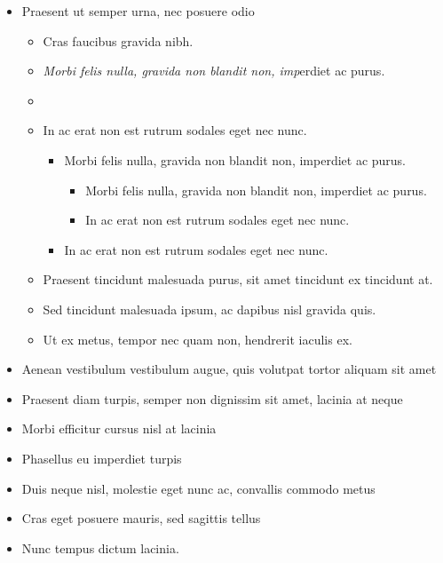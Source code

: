 \documentclass[12pt,a4paper]{report}
\begin{document}
\begin{itemize}
    \item Praesent ut semper urna, nec posuere odio
        \begin{itemize}
            \item  Cras faucibus gravida nibh.
            \item  \emph{Morbi felis nulla, gravida non blandit non, imp}erdiet ac purus.
            \item \hyperref[Mini Section1]{}
            \item  In ac erat non est rutrum sodales eget nec nunc.
                \begin{itemize}
                    \item  Morbi felis nulla, gravida non blandit non, imperdiet ac purus.
                    \begin{itemize}
                        \item  Morbi felis nulla, gravida non blandit non, imperdiet ac purus.
                        \item  In ac erat non est rutrum sodales eget nec nunc.
                    \end{itemize}
                    \item  In ac erat non est rutrum sodales eget nec nunc.
                \end{itemize}
            \item  Praesent tincidunt malesuada purus, sit amet tincidunt ex tincidunt at.
            \item  Sed tincidunt malesuada ipsum, ac dapibus nisl gravida quis.
            \item  Ut ex metus, tempor nec quam non, hendrerit iaculis ex.
        \end{itemize}
    \item Aenean vestibulum vestibulum augue, quis volutpat tortor aliquam sit amet
    \item Praesent diam turpis, semper non dignissim sit amet, lacinia at neque
    \item Morbi efficitur cursus nisl at lacinia
    \item Phasellus eu imperdiet turpis
    \item Duis neque nisl, molestie eget nunc ac, convallis commodo metus
    \item Cras eget posuere mauris, sed sagittis tellus
    \item Nunc tempus dictum lacinia. 
\end{itemize}
\end{document}
